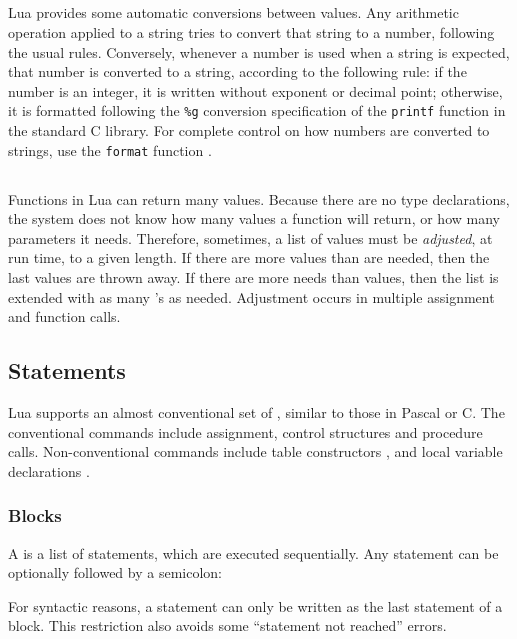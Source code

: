 \subsection{} \label{coercion}

Lua provides some automatic conversions between values.
Any arithmetic operation applied to a string tries to convert
that string to a number, following the usual rules.
Conversely, whenever a number is used when a string is expected,
that number is converted to a string, according to the following rule:
if the number is an integer, it is written without exponent or decimal point;
otherwise, it is formatted following the \verb'%g'
conversion specification of the \verb'printf' function in the
standard C library.
For complete control on how numbers are converted to strings,
use the \verb|format| function .


\subsection{} \label{adjust}

Functions in Lua can return many values.
Because there are no type declarations,
the system does not know how many values a function will return,
or how many parameters it needs.
Therefore, sometimes, a list of values must be {\em adjusted\/}, at run time,
to a given length.
If there are more values than are needed, then the last values are thrown away.
If there are more needs than values, then the list is extended with as
many  \nil's as needed.
Adjustment occurs in multiple assignment and function calls.


\subsection{Statements}

Lua supports an almost conventional set of ,
similar to those in Pascal or C.
The conventional commands include
assignment, control structures and procedure calls.
Non-conventional commands include table constructors
,
and local variable declarations .

\subsubsection{Blocks}
A  is a list of statements, which are executed sequentially.
Any statement can be optionally followed by a semicolon:
\begin{Produc}
\end{Produc}%
For syntactic reasons, a  statement can only be written
as the last statement of a block.
This restriction also avoids some ``statement not reached'' errors.

